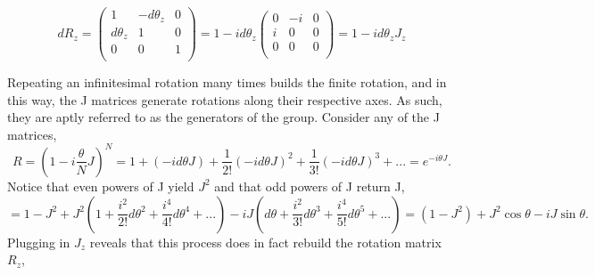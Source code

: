 \begin{equation}
dR_z = 
\begin{pmatrix}
1 & -d\theta_z & 0 \\
d\theta_z & 1 & 0 \\
0 & 0 & 1 \\
\end{pmatrix}
= 1 - id\theta_z 
\begin{pmatrix}
0 & -i & 0 \\
i & 0 & 0 \\
0 & 0 & 0 \\
\end{pmatrix}
= 1 - id\theta_z J_z
\end{equation}

Repeating an infinitesimal rotation many times builds the finite rotation, and in this way, the J matrices generate rotations along their respective axes.  As such, they are aptly referred to as the generators of the group. Consider any of the J matrices,
\begin{equation}
R = (1 - i\frac{\theta}{N} J)^{N} = 1 + (-id\theta J) + \frac{1}{2!}(-id\theta J)^2 + \frac{1}{3!}(-id\theta J)^3 + ... = e^{-i\theta J}. 
\end{equation}
Notice that even powers of J yield $J^2$ and that odd powers of J return J,
\begin{equation}
  = 1 - J^2 + J^2(1 + \frac{i^2}{2!} d\theta^2 + \frac{i^4}{4!} d\theta^4 + ...) - iJ(d\theta + \frac{i^2}{3!}d\theta^3 + \frac{i^4}{5!}d\theta^5 + ...) 
  = (1-J^2) + J^2 \cos\theta - iJ\sin\theta.
\end{equation}
Plugging in $J_z$ reveals that this process does in fact rebuild the rotation matrix $R_z$,
